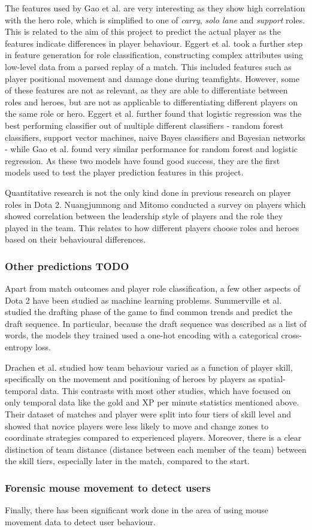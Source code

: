 \documentclass[Report.tex]{subfiles}
\begin{document}
The features used by Gao et al. are very interesting as they show high correlation with the hero role, which is simplified to one of \textit{carry}, \textit{solo lane} and \textit{support} roles. This is related to the aim of this project to predict the actual player as the features indicate differences in player behaviour. Eggert et al. \cite{dota-eggert} took a further step in feature generation for role classification, constructing complex attributes using low-level data from a parsed replay of a match. This included features such as player positional movement and damage done during teamfights. However, some of these features are not as relevant, as they are able to differentiate between roles and heroes, but are not as applicable to differentiating different players on the same role or hero. Eggert et al. \cite{dota-eggert} further found that logistic regression was the best performing classifier out of multiple different classifiers - random forest classifiers, support vector machines, naive Bayes classifiers and Bayesian networks - while Gao et al. \cite{dota-gao} found very similar performance for random forest and logistic regression. As these two models have found good success, they are the first models used to test the player prediction features in this project. 

Quantitative research is not the only kind done in previous research on player roles in Dota 2. Nuangjumnong and Mitomo \cite{dota-leadership} conducted a survey on players which showed correlation between the leadership style of players and the role they played in the team. This relates to how different players choose roles and heroes based on their behavioural differences. 

\subsubsection{Other predictions TODO}
Apart from match outcomes and player role classification, a few other aspects of Dota 2 have been studied as machine learning problems. Summerville et al. \cite{dota-draft} studied the drafting phase of the game to find common trends and predict the draft sequence. In particular, because the draft sequence was described as a list of words, the models they trained used a one-hot encoding with a categorical cross-entropy loss.

Drachen et al. \cite{dota-skill} studied how team behaviour varied as a function of player skill, specifically on the movement and positioning of heroes by players as spatial-temporal data. This contrasts with most other studies, which have focused on only temporal data like the gold and XP per minute statistics mentioned above. Their dataset of matches and player were split into four tiers of skill level and showed that novice players were less likely to move and change zones to coordinate strategies compared to experienced players. Moreover, there is a clear distinction of team distance (distance between each member of the team) between the skill tiers, especially later in the match, compared to the start.

\subsubsection{Forensic mouse movement to detect users}
Finally, there has been significant work done in the area of using mouse movement data to detect user behaviour. 
\end{document}
